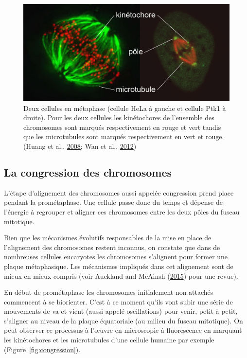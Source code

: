 \documentclass[12pt,a4paper,twoside,openright]{book}
\begin{document}
\begin{figure}[htbp]
\centering
\includegraphics{figures/intro/spindle_micro.png}
\caption{\label{fig:spindle_micro}Deux cellules en métaphase (cellule
HeLa à gauche et cellule Ptk1 à droite). Pour les deux cellules les
kinétochores de l'ensemble des chromosomes sont marqués respectivement
en rouge et vert tandis que les microtubules sont marqués respectivement
en vert et rouge. (Huang et al.,
\protect\hyperlink{ref-Huang2008}{2008}; Wan et al.,
\protect\hyperlink{ref-Wan2012}{2012})}
\end{figure}

\subsection{La congression des
chromosomes}\label{la-congression-des-chromosomes}

L'étape d'alignement des chromosomes aussi appelée congression prend
place pendant la prométaphase. Une cellule passe donc du temps et
dépense de l'énergie à regrouper et aligner ces chromosomes entre les
deux pôles du fuseau mitotique.

Bien que les mécanismes évolutifs responsables de la mise en place de
l'alignement des chromosomes restent inconnus, on constate que dans de
nombreuses cellules eucaryotes les chromosomes s'alignent pour former
une plaque métaphasique. Les mécanismes impliqués dans cet alignement
sont de mieux en mieux compris (voir Auckland and McAinsh
(\protect\hyperlink{ref-Auckland2015a}{2015}) pour une revue).

En début de prométaphase les chromosomes initialement non attachés
commencent à se biorienter. C'est à ce moment qu'ils vont subir une
série de mouvements de va et vient (aussi appelé oscillations) pour
venir, petit à petit, s'aligner au niveau de la plaque équatoriale (au
milieu du fuseau mitotique). On peut observer ce processus à l'œuvre en
microscopie à fluorescence en marquant les kinétochores et les
microtubules d'une cellule humaine par exemple
(Figure~\ref{fig:congression}).
\end{document}
